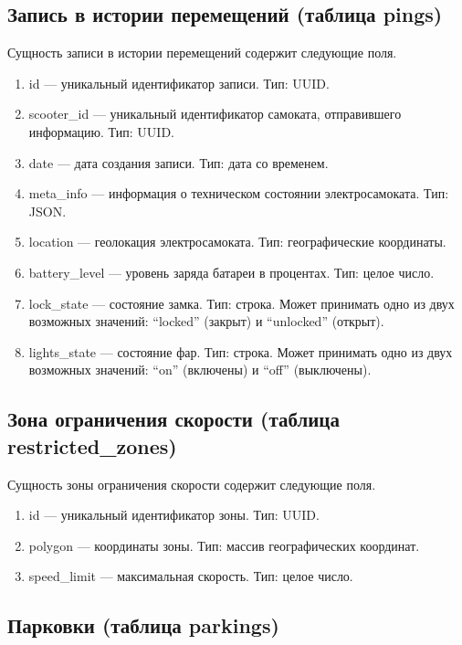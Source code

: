 \subsection{Запись в истории перемещений (таблица pings)}

Сущность записи в истории перемещений содержит следующие поля.

\begin{enumerate}
	\item id --- уникальный идентификатор записи. Тип: UUID.
	\item scooter\_id --- уникальный идентификатор самоката, отправившего информацию. Тип: UUID.
	\item date --- дата создания записи. Тип: дата со временем.
	\item meta\_info --- информация о техническом состоянии электросамоката. Тип: JSON.
	\item location --- геолокация электросамоката. Тип: географические координаты.
	\item battery\_level --- уровень заряда батареи в процентах. Тип: целое число.
	\item lock\_state --- состояние замка. Тип: строка. Может принимать одно из двух возможных значений: \enquote{locked} (закрыт) и \enquote{unlocked} (открыт).
	\item lights\_state --- состояние фар. Тип: строка. Может принимать одно из двух возможных значений: \enquote{on} (включены) и \enquote{off} (выключены).
\end{enumerate}

\subsection{Зона ограничения скорости (таблица restricted\_zones)}

Сущность зоны ограничения скорости содержит следующие поля.

\begin{enumerate}
	\item id --- уникальный идентификатор зоны. Тип: UUID.
	\item polygon --- координаты зоны. Тип: массив географических координат.
	\item speed\_limit --- максимальная скорость. Тип: целое число.
\end{enumerate}

\subsection{Парковки (таблица parkings)}

